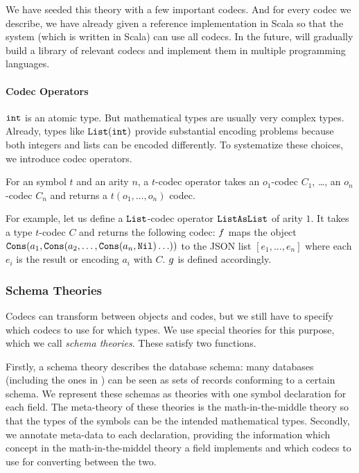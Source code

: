 We have seeded this theory with a few important codecs.
And for every codec we describe, we have already given a reference implementation in Scala so that the \MMT system (which is written in Scala) can use all codecs.
In the future, \pn will gradually build a library of relevant codecs and implement them in multiple programming languages.

\paragraph{Codec Operators}
$\Int$ is an atomic type.
But mathematical types are usually very complex types.
Already, types like $\lst(\Int)$ provide substantial encoding problems because both integers and lists can be encoded differently.
To systematize these choices, we introduce codec operators.

\begin{mydef}
  For an \MMT symbol $t$ and an arity $n$, a $t$-codec operator takes an $o_1$-codec $C_1$, \ldots, an $o_n$-codec $C_n$ and returns a $t(o_1,\ldots,o_n)$ codec.
\end{mydef}

For example, let us define a $\lst$-codec operator $\lstAsList$ of arity $1$.
It takes a type $t$-codec $C$ and returns the following codec: $\enc$ maps the object $\cons(a_1,\cons(a_2,\ldots,\cons(a_n,\nil)\ldots))$ to the JSON list $[e_1,\ldots,e_n]$ where each $e_i$ is the result or encoding $a_i$ with $C$.
$\dec$ is defined accordingly.

\subsubsection{Schema Theories}


Codecs can transform between \MMT objects and codes, but we still have to specify which codecs to use for which types.
We use special theories for this purpose, which we call \emph{schema theories}.
These satisfy two functions.

Firstly, a schema theory describes the database schema: many databases (including the ones in \LMFDB) can be seen as sets of records conforming to a certain schema.
We represent these schemas as \MMT theories with one symbol declaration for each field.
The meta-theory of these theories is the math-in-the-middle theory  so that the types of the symbols can be the intended mathematical types.
Secondly, we annotate meta-data to each declaration, providing the information which concept in the math-in-the-middel theory a field implements and which codecs to use for converting between the two.

